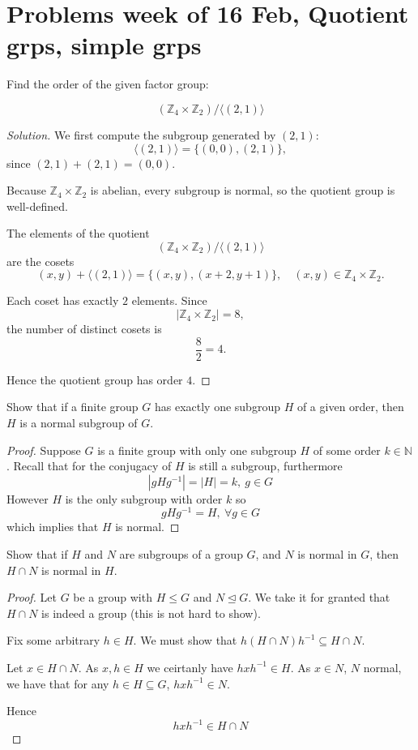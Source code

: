 \section{Problems week of 16 Feb, Quotient grps, simple grps}
\begin{prob}
    Find the order of the given factor group: 

    \[
        (\mathbb Z_4 \times \mathbb Z_2) / \langle (2,1)\rangle
    \]
\end{prob}
\begin{proof}[Solution]
We first compute the subgroup generated by $(2,1)$:
\[
\langle (2,1) \rangle = \{(0,0),(2,1)\},
\]
since $(2,1)+(2,1)=(0,0)$.

Because $\mathbb Z_4 \times \mathbb Z_2$ is abelian, every subgroup is normal,
so the quotient group is well-defined.

The elements of the quotient
\[
(\mathbb Z_4 \times \mathbb Z_2)/\langle(2,1)\rangle
\]
are the cosets
\[
(x,y)+\langle(2,1)\rangle
= \{(x,y),(x+2,y+1)\},
\quad (x,y)\in \mathbb Z_4\times\mathbb Z_2.
\]

Each coset has exactly $2$ elements. Since
\[
|\mathbb Z_4 \times \mathbb Z_2|=8,
\]
the number of distinct cosets is
\[
\frac{8}{2}=4.
\]

Hence the quotient group has order $4$.
\end{proof}
\begin{prob}
    Show that if a finite group $G$ has exactly one subgroup $H$ 
    of a given order, then $H$ is a normal subgroup of $G$.
\end{prob}
\begin{proof}
    Suppose $G$ is a finite group with only one subgroup $H$ of some 
    order $k \in \mathbb N$. 
    Recall that for the conjugacy of $H$ is still a subgroup, 
    furthermore
    \[
        |gHg^{-1}| = |H| = k, \: g \in G
    \]
    However $H$ is the only subgroup with order $k$ so 
    \[
        gHg^{-1} = H, \: \forall g \in G
    \]
    which implies that $H$ is normal.

\end{proof}
\begin{prob}
    Show that if $H$ and $N$ are subgroups of a group $G$, and 
    $N$ is normal in $G$, then $H \cap N$ is normal in $H$. 
\end{prob}
\begin{proof}
    Let $G$ be a group with $H \leq G$ and $N \trianglelefteq G$.
    We take it for granted that $H \cap N$ is indeed a group 
    (this is not hard to show). 

    Fix some arbitrary $h \in H$.
    We must show that $h(H\cap N)h^{-1} \subseteq H \cap N$. 
    
    Let $x \in H \cap N$. As $x, h \in H$ we ceirtanly have 
    $hxh^{-1} \in H$. As $x \in N$, $N$ normal, we have that 
    for any $h \in H \subseteq G$, $hxh^{-1} \in N$. 

    Hence 
    \[
        hxh^{-1} \in H \cap N
    \]
\end{proof}

